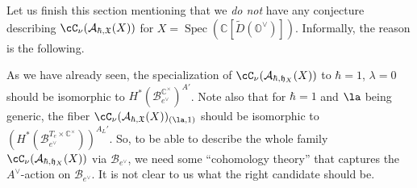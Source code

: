\documentclass[12pt]{amsart}
\begin{document}

Let us finish this section mentioning that we {\emph{do not}} have any conjecture describing $\cC_\nu(\mathcal{A}_{\hbar,\mathfrak{X}}(X))$ for $X=\operatorname{Spec}(\mathbb{C}[\widetilde{D}(\mathbb{O}^\vee)])$. Informally, the reason is the following. 


As we have already seen, the specialization of $\cC_\nu(\mathcal{A}_{\hbar,\mathfrak{h}_X}(X))$ to $\hbar=1$, $\lambda=0$ should be isomorphic to $H^*(\mathcal{B}_{e^\vee}^{\mathbb{C}^\times})^{A'}$. Note also that for $\hbar=1$ and $\la$ being generic, the fiber $\cC_\nu(\mathcal{A}_{\hbar,\mathfrak{X}}(X))_{(\la,1)}$ should be isomorphic to $(H^*(\mathcal{B}_{e^\vee}^{T_{e} \times \mathbb{C}^\times}))^{A_L'}$.
So, to be able to describe the whole family $\cC_\nu(\mathcal{A}_{\hbar,\mathfrak{h}_X}(X))$ via $\mathcal{B}_{e^\vee}$, we need some ``cohomology theory'' that captures the $A^\vee$-action on $\mathcal{B}_{e^\vee}$. It is not clear to us what the right candidate should be.  
\end{document}
